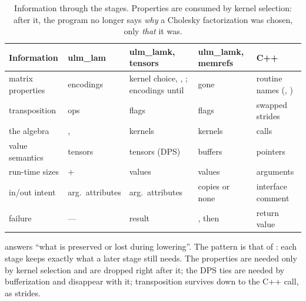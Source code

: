 \begin{table}[h]
\centering\small
\begin{tabularx}{\linewidth}{@{}P{2.7cm}P{2.6cm}P{2.6cm}P{2.6cm}L@{}}
\toprule
\textbf{Information} & \textbf{ulm\_lam} & \textbf{ulm\_lamk, tensors} & \textbf{ulm\_lamk, memrefs} & \textbf{C++} \\
\midrule
matrix properties & encodings & kernel choice, , ; encodings until  & gone & routine names (, ) \\
transposition &  ops &  flags &  flags & swapped strides \\
the algebra & ,  & kernels & kernels & calls \\
value semantics & tensors & tensors (DPS) & buffers & pointers \\
run-time sizes &  +  &  values &  values &  arguments \\
in/out intent & arg.\ attributes & arg.\ attributes & copies or none & interface comment \\
failure & --- &  result & , then  & return value \\
\bottomrule
\end{tabularx}
\caption{Information through the stages. Properties are consumed by kernel
selection: after it, the program no longer says \emph{why} a Cholesky
factorization was chosen, only \emph{that} it was.}
\label{tab:lost}
\end{table}

 answers ``what is preserved or lost during lowering''. The
pattern is that of : each stage keeps exactly what a later stage still needs. The
properties are needed only by kernel selection and are dropped right after
it; the DPS ties are needed by bufferization and disappear with it;
transposition survives down to the C++ call, as strides.
